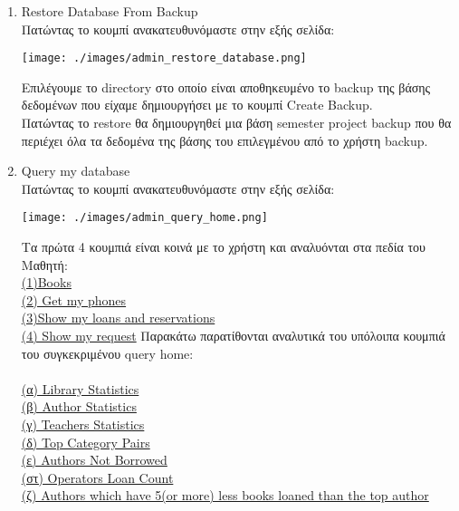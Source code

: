 \documentclass[14pt]{report}
\begin{document}
\begin{enumerate}
		\newpage
		\hypertarget{a-restore-database}{}
		\item Restore Database From Backup \\
		Πατώντας το κουμπί ανακατευθυνόμαστε στην εξής σελίδα: \\
		
		\vspace{\baselineskip}
		
		\texttt{[image: ./images/admin\_restore\_database.png]}
		
		\vspace{\baselineskip}
		
		Επιλέγουμε το directory στο οποίο είναι αποθηκευμένο το backup της βάσης δεδομένων που είχαμε δημιουργήσει με το κουμπί Create Backup. \\
		Πατώντας το restore θα δημιουργηθεί μια βάση semester project backup που θα περιέχει όλα τα δεδομένα της βάσης του επιλεγμένου από το χρήστη backup. \\
		
		\newpage
		\hypertarget{a-query-database}{}
		\item Query my database \\
		Πατώντας το κουμπί ανακατευθυνόμαστε στην εξής σελίδα: \\
		
		\vspace{\baselineskip}
		
		\texttt{[image: ./images/admin\_query\_home.png]}
		
		\vspace{\baselineskip}
		
		Τα πρώτα 4 κουμπιά είναι κοινά με το χρήστη και αναλυόνται στα πεδία του Μαθητή: \\
		\hyperlink{s-books}{(1)Books} \\ 
		\hyperlink{s-get-phones}{(2) Get my phones} \\ 
		\hyperlink{s-show-loans}{(3)Show my loans and reservations} \\
		\hyperlink{s-show-requests}{(4) Show my request} 
		\newpage
		Παρακάτω παρατίθονται αναλυτικά του υπόλοιπα κουμπιά του συγκεκριμένου query home: \\ \\
		\hyperlink{a-library-stats}{(α) Library Statistics} \\
		\hyperlink{a-author-stats}{(β) Author Statistics} \\
		\hyperlink{a-teacher-stats}{(γ) Teachers Statistics} \\
		\hyperlink{a-top-category-pairs}{(δ) Top Category Pairs} \\
		\hyperlink{a-authors-not-borrowed}{(ε) Authors Not Borrowed} \\
		\hyperlink{a-operator-loan-count}{(στ) Operators Loan Count} \\
		\hyperlink{a-authors-less-books}{(ζ) Authors which have 5(or more) less books loaned than the top author} \\
		

\end{enumerate}
\end{document}
